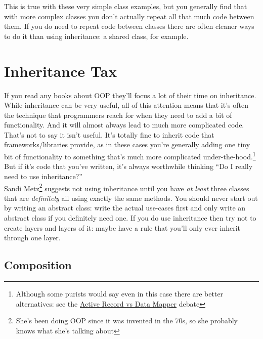 This is true with these very simple class examples, but you generally find that with more complex classes you don't actually repeat all that much code between them. If you do need to repeat code between classes there are often cleaner ways to do it than using inheritance: a shared class, for example.


\section{Inheritance Tax}


If you read any books about OOP they'll focus a lot of their time on inheritance. While inheritance can be very useful, all of this attention means that it's often the technique that programmers reach for when they need to add a bit of functionality. And it will almost always lead to much more complicated code.
\\

That's not to say it isn't useful. It's totally fine to inherit code that frameworks/libraries provide, as in these cases you're generally adding one tiny bit of functionality to something that's much more complicated under-the-hood.\footnote{Although some purists would say even in this case there are better alternatives: see the \href{https://www.thoughtfulcode.com/orm-active-record-vs-data-mapper/}{Active Record vs Data Mapper} debate} But if it's code that you've written, it's always worthwhile thinking ``Do I really need to use inheritance?''
\\

Sandi Metz\footnote{She's been doing OOP since it was invented in the 70s, so she probably knows what she's talking about} suggests not using inheritance until you have \textit{at least} three classes that are \textit{definitely} all using exactly the same methods. You should never start out by writing an abstract class: write the actual use-cases first and only write an abstract class if you definitely need one. If you do use inheritance then try not to create layers and layers of it: maybe have a rule that you'll only ever inherit through one layer.


\subsection{Composition}


